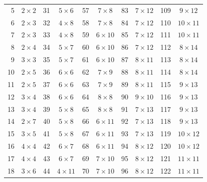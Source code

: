 \begin{longtable}{
r|c @{\qquad}
r|c @{\qquad}
r|c @{\qquad}
r|c @{\qquad}
r|c
}
5  & $2 \times 2$  &
31 & $5 \times 6$  &
57 & $7 \times 8$  &
83 & $7 \times 12$ &
109 & $9 \times 12$ \\

6  & $2 \times 3$  &
32 & $4 \times 8$  &
58 & $7 \times 8$  &
84 & $7 \times 12$ &
110 & $10 \times 11$ \\

7  & $2 \times 3$  &
33 & $4 \times 8$  &
59 & $6 \times 10$ &
85 & $7 \times 12$ &
111 & $10 \times 11$ \\

8  & $2 \times 4$  &
34 & $5 \times 7$  &
60 & $6 \times 10$ &
86 & $7 \times 12$ &
112 & $8 \times 14$ \\

9  & $3 \times 3$  &
35 & $5 \times 7$  &
61 & $6 \times 10$ &
87 & $8 \times 11$ &
113 & $8 \times 14$ \\

10 & $2 \times 5$  &
36 & $6 \times 6$  &
62 & $7 \times 9$  &
88 & $8 \times 11$ &
114 & $8 \times 14$ \\

11 & $2 \times 5$  &
37 & $6 \times 6$  &
63 & $7 \times 9$  &
89 & $8 \times 11$ &
115 & $9 \times 13$ \\

12 & $3 \times 4$  &
38 & $6 \times 6$  &
64 & $8 \times 8$  &
90 & $9 \times 10$ &
116 & $9 \times 13$ \\

13 & $3 \times 4$  &
39 & $5 \times 8$  &
65 & $8 \times 8$  &
91 & $7 \times 13$ &
117 & $9 \times 13$ \\

14 & $2 \times 7$  &
40 & $5 \times 8$  &
66 & $6 \times 11$ &
92 & $7 \times 13$ &
118 & $9 \times 13$ \\

15 & $3 \times 5$  &
41 & $5 \times 8$  &
67 & $6 \times 11$ &
93 & $7 \times 13$ &
119 & $10 \times 12$ \\

16 & $4 \times 4$  &
42 & $6 \times 7$  &
68 & $6 \times 11$ &
94 & $8 \times 12$ &
120 & $10 \times 12$ \\

17 & $4 \times 4$  &
43 & $6 \times 7$  &
69 & $7 \times 10$ &
95 & $8 \times 12$ &
121 & $11 \times 11$ \\

18 & $3 \times 6$  &
44 & $4 \times 11$ &
70 & $7 \times 10$ &
96 & $8 \times 12$ &
122 & $11 \times 11$ \\


\end{longtable}
